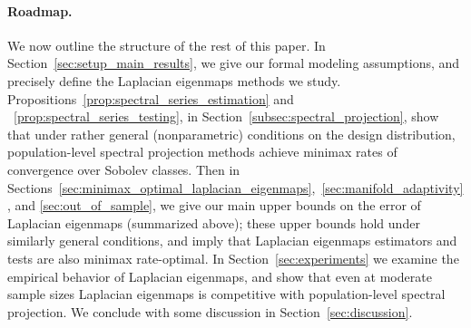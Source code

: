 \paragraph{Roadmap.}
We now outline the structure of the rest of this paper. In Section~\ref{sec:setup_main_results}, we give our formal modeling assumptions, and precisely define the Laplacian eigenmaps methods we study. Propositions~\ref{prop:spectral_series_estimation} and ~\ref{prop:spectral_series_testing}, in Section~\ref{subsec:spectral_projection}, show that under rather general (nonparametric) conditions on the design distribution, population-level spectral projection methods achieve minimax rates of convergence over Sobolev classes. Then in Sections~\ref{sec:minimax_optimal_laplacian_eigenmaps},~\ref{sec:manifold_adaptivity}, and \ref{sec:out_of_sample}, we give our main upper bounds on the error of Laplacian eigenmaps (summarized above); these upper bounds hold under similarly general conditions, and imply that Laplacian eigenmaps estimators and tests are also minimax rate-optimal. In Section~\ref{sec:experiments} we examine the empirical behavior of Laplacian eigenmaps, and show that even at moderate sample sizes Laplacian eigenmaps is competitive with population-level spectral projection. We conclude with some discussion in Section~\ref{sec:discussion}. 

